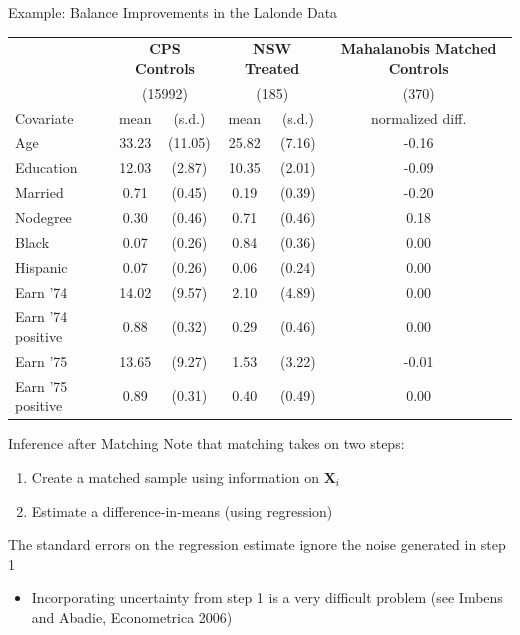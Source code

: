 \documentclass[aspectratio=169,t,11pt,table]{beamer}
\begin{document}
\begin{frame}{Example: Balance Improvements in the Lalonde Data} 
  \begin{table}   
    \footnotesize
    \begin{tabular}{l c c c c c}
      \toprule
      & \multicolumn{2}{c}{\textbf{CPS Controls}} & \multicolumn{2}{c}{\textbf{NSW Treated}} &  \multicolumn{1}{c}{\textbf{Mahalanobis Matched Controls}} \\
      & \multicolumn{2}{c}{(15992)} & \multicolumn{2}{c}{(185)} & (370) \\
      Covariate & mean & (s.d.) & mean & (s.d.) & normalized diff. \\

      \midrule
      Age & 33.23 & (11.05) & 25.82 & (7.16) & -0.16 \\
      Education & 12.03 & (2.87) & 10.35 & (2.01) & -0.09 \\
      Married & 0.71 & (0.45) & 0.19 & (0.39) & -0.20 \\
      Nodegree & 0.30 & (0.46) & 0.71 & (0.46) & 0.18 \\
      Black & 0.07 & (0.26) & 0.84 & (0.36) & 0.00 \\
      Hispanic & 0.07 & (0.26) & 0.06 & (0.24) & 0.00 \\
      Earn '74 & 14.02 & (9.57) & 2.10 & (4.89) & 0.00 \\
      Earn '74 positive & 0.88 & (0.32) & 0.29 & (0.46) & 0.00 \\
      Earn '75 & 13.65 & (9.27) & 1.53 & (3.22) & -0.01 \\
      Earn '75 positive & 0.89 & (0.31) & 0.40 & (0.49) & 0.00 \\
      \bottomrule
    \end{tabular}
  \end{table}
\end{frame}

\begin{frame}{Inference after Matching}
  Note that matching takes on two steps:
  \begin{enumerate}
    \item Create a matched sample using information on $\bm{X}_i$
    \item Estimate a difference-in-means (using regression)
  \end{enumerate}

  \bigskip
  The standard errors on the regression estimate ignore the noise generated in step 1
  \begin{itemize}
    \item Incorporating uncertainty from step 1 is a very difficult problem (see Imbens and Abadie, Econometrica 2006)
  \end{itemize}
\end{frame}
\end{document}
